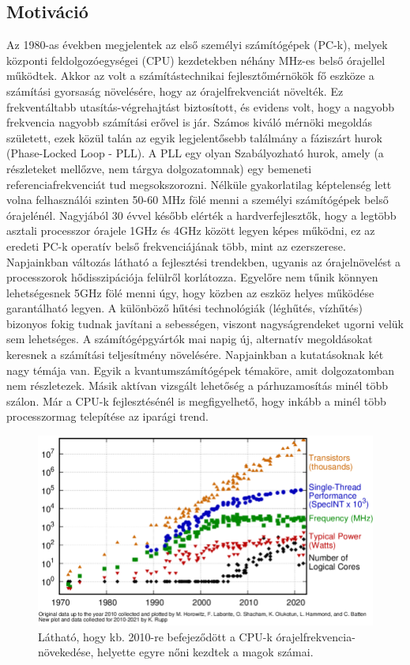\subsection{Motiváció}
Az 1980-as években megjelentek az első személyi számítógépek (PC-k), melyek központi feldolgozóegységei (CPU) kezdetekben néhány MHz-es belső órajellel működtek. Akkor az volt a számítástechnikai fejlesztőmérnökök fő eszköze a számítási gyorsaság növelésére, hogy az órajelfrekvenciát növelték. Ez frekventáltabb utasítás-végrehajtást biztosított, és evidens volt, hogy a nagyobb frekvencia nagyobb számítási erővel is jár. Számos kiváló mérnöki megoldás született, ezek közül talán az egyik legjelentősebb találmány a fáziszárt hurok (Phase-Locked Loop - PLL). A PLL egy olyan Szabályozható hurok, amely (a részleteket mellőzve, nem tárgya dolgozatomnak) egy bemeneti referenciafrekvenciát tud megsokszorozni. Nélküle gyakorlatilag képtelenség lett volna felhasználói szinten 50-60 MHz fölé menni a személyi számítógépek belső órajelénél. Nagyjából 30 évvel később elérték a hardverfejlesztők, hogy a legtöbb asztali processzor órajele 1GHz és 4GHz között legyen képes működni, ez az eredeti PC-k operatív belső frekvenciájának több, mint az ezerszerese. Napjainkban változás látható a fejlesztési trendekben, ugyanis az órajelnövelést a processzorok hődisszipációja felülről korlátozza. Egyelőre nem tűnik könnyen lehetségesnek 5GHz fölé menni úgy, hogy közben az eszköz helyes működése garantálható legyen. A különböző hűtési technológiák (léghűtés, vízhűtés) bizonyos fokig tudnak javítani a sebességen, viszont nagyságrendeket ugorni velük sem lehetséges. 
A számítógépgyártók mai napig új, alternatív megoldásokat keresnek a számítási teljesítmény növelésére. Napjainkban a kutatásoknak két nagy témája van. Egyik a kvantumszámítógépek témaköre, amit dolgozatomban nem részletezek. Másik aktívan vizsgált lehetőség a párhuzamosítás minél több szálon. Már a CPU-k fejlesztésénél is megfigyelhető, hogy inkább a minél több processzormag telepítése az iparági trend.

\begin{figure}[ht!]
	\centering
	\includegraphics[width=150mm, keepaspectratio]{figures/CPU-cores-trend.png}
	\caption{Látható, hogy kb. 2010-re befejeződött a CPU-k órajelfrekvencia-növekedése, helyette egyre nőni kezdtek a magok számai. \cite{CPUcores} }
\end{figure}


